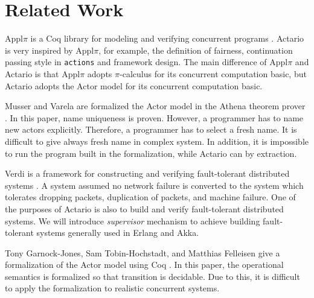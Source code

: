 \section{Related Work}
\label{sec:relatedwork}

Appl\(\pi\) is a Coq library for modeling and verifying concurrent programs \cite{Affeldt200817}.
Actario is very inspired by Appl\(\pi\), for example, the definition of fairness, continuation passing style in \texttt{actions} and framework design.
The main difference of Appl\(\pi\) and Actario is that Appl\(\pi\) adopts \(\pi\)-calculus for its concurrent computation basic, but Actario adopts the Actor model for its concurrent computation basic.

Musser and Varela are formalized the Actor model in the Athena theorem prover \cite{Athena}\cite{Musser:2013aa}. %
In this paper, name uniqueness is proven.
However, a programmer has to name new actors explicitly.
Therefore, a programmer has to select a fresh name. It is difficult to give always fresh name in complex system.
In addition, it is impossible to run the program built in the formalization, while Actario can by extraction.

Verdi is a framework for constructing and verifying fault-tolerant distributed systems \cite{Verdi}.
A system assumed no network failure is converted to the system which tolerates dropping packets, duplication of packets, and machine failure.
One of the purposes of Actario is also to build and verify fault-tolerant distributed systems.
We will introduce \textit{supervisor} mechanism to achieve building fault-tolerant systems generally used in Erlang and Akka.


Tony Garnock-Jones, Sam Tobin-Hochstadt, and Matthias Felleisen give a formalization of the Actor model using Coq \cite{Garnock-Jones:2014aa}.
In this paper, the operational semantics is formalized so that transition is decidable.
Due to this, it is difficult to apply the formalization to realistic concurrent systems.

